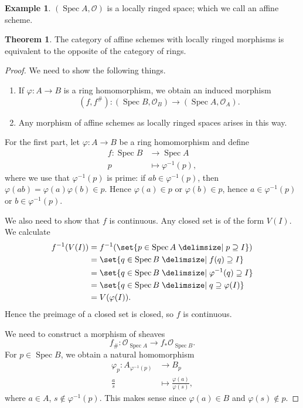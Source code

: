 \documentclass[a4paper]{amsbook}
\theoremstyle{definition}
\newtheorem*{theorem*}{Theorem}
\newtheorem*{example*}{Example}
\DeclareMathOperator\Spec{Spec}
\begin{document}
\begin{example*}
\label{SpecIsLRS}
$(\Spec A, \mathcal{O})$ is a locally ringed space; which we call an affine scheme.
\end{example*}

\begin{theorem*}
\label{CategoryOfAffineSchemes}
The category of affine schemes with locally ringed morphisms is equivalent
to the opposite of the category of rings.
\end{theorem*}
\begin{proof}[Proof]
We need to show the following things.
\begin{enumerate}
	\item If $\varphi\colon A\to B$ is a ring homomorphism, we obtain an
		induced morphism
		\[ (f, f^\#)\colon (\Spec B, \mathcal{O}_B)\to (\Spec A, \mathcal{O}_A). \]
	\item Any morphism of affine schemes as locally ringed spaces arises in
		this way.
\end{enumerate}

For the first part, let $\varphi\colon A\to B$ be a ring homomorphism and define
\begin{align*}
	f\colon \Spec B&\to \Spec A\\
	p&\mapsto \varphi^{-1}(p),
\end{align*}
where we use that $\varphi^{-1}(p)$ is prime: if $ab \in \varphi^{-1}(p)$, then
$\varphi(ab) = \varphi(a)\varphi(b) \in p$. Hence $\varphi(a) \in p$ or
$\varphi(b) \in p$, hence $a \in \varphi^{-1}(p)$ or $b \in \varphi^{-1}(p)$.

We also need to show that $f$ is continuous. Any closed set is of the form
$V(I)$. We calculate
\begin{align*}
	f^{-1}(V(I)) &= f^{-1}(\set{p \in \Spec A\given p\supseteq I})\\
	&= \set{q \in \Spec B\given f(q) \supseteq I}\\
	&= \set{q \in \Spec B\given \varphi^{-1}(q)\supseteq I}\\
	&= \set{q \in \Spec B\given q\supseteq \varphi(I)}\\
	&= V(\varphi(I)).
\end{align*}
Hence the preimage of a closed set is closed, so $f$ is continuous.

We need to construct a morphism of sheaves
\[ f_\#\colon \mathcal{O}_{\Spec A} \to f_*\mathcal{O}_{\Spec B}. \]
For $p \in \Spec B$, we obtain a natural homomorphism
\begin{align*}
	\varphi_p\colon A_{\varphi^{-1}(p)}&\to B_p\\
	\frac{a}{s}&\mapsto \frac{\varphi(a)}{\varphi(s)},
\end{align*}
where $a \in A$, $s\notin \varphi^{-1}(p)$. This makes sense since $\varphi(a) \in B$
and $\varphi(s)\notin p$.


\end{proof}
\end{document}
